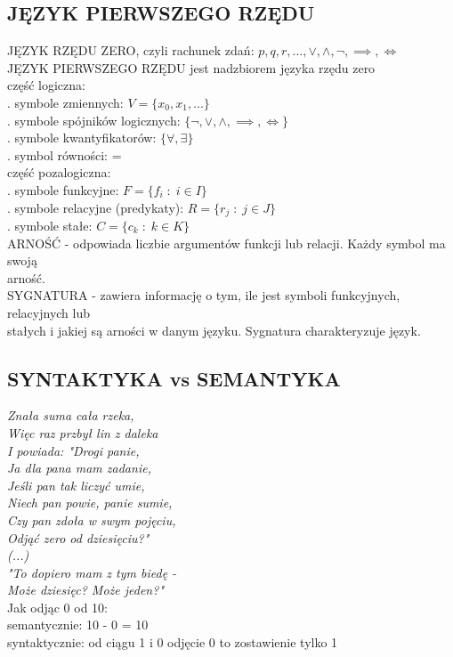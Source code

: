 \subsection{JĘZYK PIERWSZEGO RZĘDU}
{\color{emp}JĘZYK RZĘDU ZERO}, czyli rachunek zdań: $p, q, r, ..., \lor, \land, \neg, \implies, \iff$\bigskip\\
{\color{emp}JĘZYK PIERWSZEGO RZĘDU} jest nadzbiorem języka rzędu zero\medskip\\
{\color{acc}część logiczna:}\smallskip\\
    . symbole zmiennych: $V=\{x_0, x_1, ...\}$\\
    . symbole spójników logicznych: $\{\neg, \lor, \land, \implies, \iff\}$\\
    . symbole kwantyfikatorów: $\{\forall, \exists\}$\\
    . symbol równości: =\medskip\\
{\color{acc}część pozalogiczna:}\smallskip\\
    . symbole funkcyjne: $F=\{f_i\;:\;i\in I\}$\\
    . symbole relacyjne (predykaty): $R=\{r_j\;:\;j\in J\}$\\
    . symbole stałe: $C=\{c_k\;:\; k\in K\}$\medskip\\
{\color{def}ARNOŚĆ} - odpowiada liczbie argumentów funkcji lub relacji. Każdy symbol ma swoją \\arność.\smallskip\\
{\color{def}SYGNATURA} - zawiera informację o tym, ile jest symboli funkcyjnych, relacyjnych lub \\stałych i jakiej są arności w danym języku. Sygnatura charakteryzuje język.

\subsection{SYNTAKTYKA vs SEMANTYKA}
\emph{Znała suma cała rzeka,\\ 
Więc raz przbył lin z daleka\\
I powiada: "Drogi panie,\\
Ja dla pana mam zadanie,\\
Jeśli pan tak liczyć umie,\\
Niech pan powie, panie sumie,\\
Czy pan zdoła w swym pojęciu,\\
Odjąć zero od dziesięciu?"\\
(...)\\
"To dopiero mam z tym biedę - \\
Może dziesięc? Może jeden?" }\medskip\\
Jak odjąc 0 od 10:\\
    \indent semantycznie: 10 - 0 = 10\\
    \indent syntaktycznie: od ciągu 1 i 0 odjęcie 0 to zostawienie tylko 1\bigskip\\

